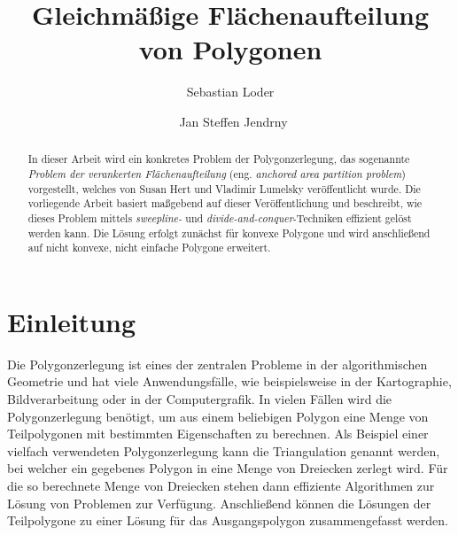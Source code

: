 \documentclass[ngerman]{seminarbeitrag}
\begin{document}
\title{Gleichmäßige Flächenaufteilung von Polygonen}
\author{Sebastian Loder\and\ Jan Steffen Jendrny}

\maketitle%

\begin{abstract}
In dieser Arbeit wird ein konkretes Problem der Polygonzerlegung, das sogenannte \emph{Problem der verankerten Flächenaufteilung} (eng. \emph{anchored area partition problem}) vorgestellt, welches von Susan Hert und Vladimir Lumelsky \cite{Hert.1998} veröffentlicht wurde. Die vorliegende Arbeit basiert maßgebend auf dieser Veröffentlichung und beschreibt, wie dieses Problem mittels \emph{sweepline-} und \emph{divide-and-conquer}-Techniken effizient gelöst werden kann. Die Lösung erfolgt zunächst für konvexe Polygone und wird anschließend auf nicht konvexe, nicht einfache Polygone erweitert.

\end{abstract}

\section{Einleitung}\label{einleitung}
Die Polygonzerlegung ist eines der zentralen Probleme in der algorithmischen Geometrie und hat viele Anwendungsfälle, wie beispielsweise in der Kartographie,
Bildverarbeitung oder in der Computergrafik. In vielen Fällen wird die Polygonzerlegung benötigt, um aus einem beliebigen Polygon eine Menge von Teilpolygonen mit bestimmten
Eigenschaften zu berechnen. Als Beispiel einer vielfach verwendeten Polygonzerlegung kann die Triangulation genannt werden, bei welcher ein gegebenes Polygon in eine Menge von Dreiecken
zerlegt wird. Für die so berechnete Menge von Dreiecken stehen dann effiziente Algorithmen zur Lösung von Problemen zur Verfügung. Anschließend können die Lösungen der Teilpolygone zu
einer Lösung für das Ausgangspolygon zusammengefasst werden. \\
\end{document}
